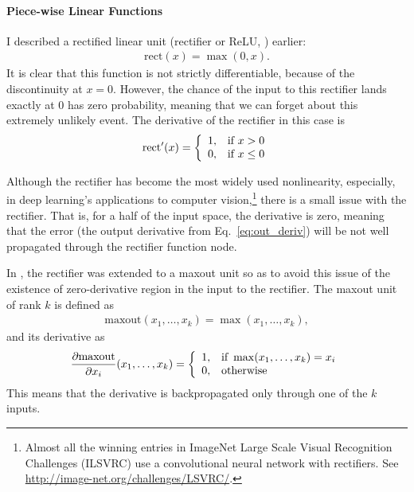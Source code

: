 \documentclass{report}
\newcommand{\rect}{\text{rect}}
\newcommand{\maxout}{\text{maxout}}
\begin{document}
\paragraph{Piece-wise Linear Functions}

I described a rectified linear unit (rectifier or ReLU,
\citep{nair2010rectified,glorot2011deep}) earlier:
\begin{align*}
    \rect(x) = \max(0, x).
\end{align*}
It is clear that this function is not strictly differentiable, because of the
discontinuity at $x=0$. However, the chance of the input to this rectifier lands
exactly at $0$ has zero probability, meaning that we can forget about this
extremely unlikely event. The derivative of the rectifier in this case is
\begin{align*}
    \rect'(x) = \left\{ 
        \begin{array}{l l}
            1, & \text{if }x > 0 \\
            0, & \text{if }x \leq 0
        \end{array}
        \right.
\end{align*}

Although the rectifier has become the most widely used nonlinearity, especially,
in deep learning's applications to computer vision,\footnote{
    Almost all the winning entries in ImageNet Large Scale Visual Recognition
    Challenges (ILSVRC) use a convolutional neural network with rectifiers. See
    \url{http://image-net.org/challenges/LSVRC/}.
}
there is a small issue with the rectifier. That is, for a half of the input
space, the derivative is zero, meaning that the error (the output derivative
from Eq.~\eqref{eq:out_deriv}) will be not well propagated through the rectifier
function node.

In \citet{goodfellow2013maxout}, the rectifier was extended to a maxout unit so
as to avoid this issue of the existence of zero-derivative region in the input
to the rectifier. The maxout unit of rank $k$ is defined as
\begin{align*}
    \maxout(x_1, \ldots, x_k) = \max(x_1, \ldots, x_k),
\end{align*}
and its derivative as
\begin{align*}
    \frac{\partial \maxout}{\partial x_i}(x_1, \dots, x_k) = 
    \left\{
        \begin{array}{l l}
            1, & \text{if } \max(x_1, \ldots, x_k) = x_i \\
            0, & \text{otherwise}
        \end{array}
        \right.
\end{align*}
This means that the derivative is backpropagated only through one of the $k$
inputs.
\end{document}

